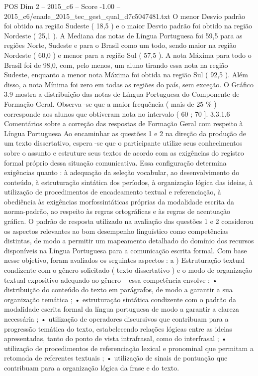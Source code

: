 \begin{textsample}{POS Dim 2 – 2015\_c6 – Score -1.00 – 2015\_c6/enade\_2015\_tec\_gest\_qual\_d7c5047481.txt}
O menor Desvio padrão foi obtido na região Sudeste ( 18,5 ) e o maior Desvio padrão foi obtido na região Nordeste ( 25,1 ).
A Mediana das notas de Língua Portuguesa foi 59,5 para as regiões Norte, Sudeste e para o Brasil como um todo, sendo maior na região Nordeste ( 60,0 ) e menor para a região Sul ( 57,5 ).
A nota Máxima para todo o Brasil foi de 98,0, com, pelo menos, um aluno tirando essa nota na região Sudeste, enquanto a menor nota Máxima foi obtida na região Sul ( 92,5 ).
Além disso, a nota Mínima foi zero em todas as regiões do país, sem exceção.
O Gráfico 3.9 mostra a distribuição das notas de Língua Portuguesa do Componente de Formação Geral.
Observa -se que a maior frequência ( mais de 25 \% ) corresponde aos alunos que obtiveram nota no intervalo ( 60 ; 70 ]. 3.3.1.6 Comentários sobre a correção das respostas de Formação Geral com respeito à Língua Portuguesa Ao encaminhar as questões 1 e 2 na direção da produção de um texto dissertativo, espera -se que o participante utilize seus conhecimentos sobre o assunto e estruture seus textos de acordo com as exigências do registro formal próprio dessa situação comunicativa.
Essa configuração determina exigências quanto : à adequação da seleção vocabular, ao desenvolvimento do conteúdo, à estruturação sintática dos períodos, à organização lógica das ideias, à utilização de procedimentos de encadeamento textual e referenciação, à obediência às exigências morfossintáticas próprias da modalidade escrita da norma-padrão, ao respeito às regras ortográficas e às regras de acentuação gráfica.
O padrão de resposta utilizado na avaliação das questões 1 e 2 considerou os aspectos relevantes ao bom desempenho linguístico como competências distintas, de modo a permitir um mapeamento detalhado do domínio dos recursos disponíveis na Língua Portuguesa para a comunicação escrita formal.
Com base nesse objetivo, foram avaliados os seguintes aspectos : a ) Estruturação textual condizente com o gênero solicitado ( texto dissertativo ) e o modo de organização textual expositivo adequado ao gênero – essa competência envolve : • distribuição do conteúdo do texto em parágrafos, de modo a garantir a sua organização temática ; • estruturação sintática condizente com o padrão da modalidade escrita formal da língua portuguesa de modo a garantir a clareza necessária ; • utilização de operadores discursivos que contribuam para a progressão temática do texto, estabelecendo relações lógicas entre as ideias apresentadas, tanto do ponto de vista intrafrasal, como do interfrasal ; • utilização de procedimentos de referenciação lexical e pronominal que permitam a retomada de referentes textuais ; • utilização de sinais de pontuação que contribuam para a organização lógica da frase e do texto.

\end{textsample}
